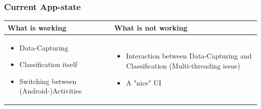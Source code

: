 \documentclass[aspectratio=169]{beamer}
\begin{document}
\begin{frame}
	\frametitle{Current App-state}
	\vspace*{15pt}
	\begin{tabular}{p{}|p{}}
		\textbf{What is working} & \textbf{What is not working}\\
		\hline
		\begin{itemize}
			\item Data-Capturing
			\item Classification itself 
			\item Switching between (Android-)Activities
		\end{itemize} & 
		\begin{itemize}
			\item Interaction between Data-Capturing and Classification (Multi-threading issue)
			\item A "nice" UI
		\end{itemize}
	\end{tabular}
\end{frame}
\end{document}
